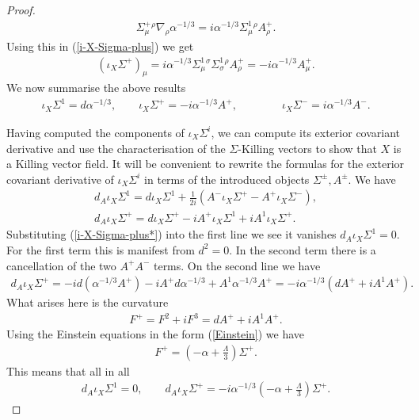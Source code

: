 \documentclass[10pt]{report}
\theoremstyle{definition}
\begin{document}
\begin{proof}
       \begin{align}
      \Sigma^+_\mu{}^\rho \nabla_\rho \alpha^{-1/3}  = i \alpha^{-1/3} \Sigma^1_\mu{}^\rho A^+_\rho.
      \end{align}
      Using this in (\ref{i-X-Sigma-plus}) we get
       \begin{align}
      (\iota_X \Sigma^+)_\mu =  i \alpha^{-1/3} \Sigma^1_\mu{}^\sigma  \Sigma^1_\sigma{}^\rho A^+_\rho = -i \alpha^{-1/3}A^+_\mu.
      \end{align}
      We now summarise the above results
      \begin{align}\label{i-X-Sigma-plus*}
      \iota_X \Sigma^1 = d \alpha^{-1/3}, \qquad \iota_X \Sigma^+= -i \alpha^{-1/3}A^+, \qquad  \qquad \iota_X \Sigma^-= i \alpha^{-1/3}A^-.
 \end{align}
 
  Having computed the components of $\iota_X \Sigma^i$, we can compute its exterior covariant derivative and use the characterisation of the $\Sigma$-Killing vectors to show that $X$ is a Killing vector field. It will be convenient to rewrite the formulas for the exterior covariant derivative of $\iota_X \Sigma^i$ in terms of the introduced objects $\Sigma^\pm, A^\pm$. We have
   \begin{align}
  d_A \iota_X \Sigma^1 = d \iota_X \Sigma^1 + \frac{1}{2i} (A^- \iota_X \Sigma^+ - A^+ \iota_X \Sigma^-), \\ \nonumber
  d_A \iota_X\Sigma^+ = d  \iota_X \Sigma^+ - i A^+ \iota_X \Sigma^1 + i A^1 \iota_X \Sigma^+.
    \end{align}
    Substituting (\ref{i-X-Sigma-plus*}) into the first line we see it vanishes $d_A \iota_X \Sigma^1=0$. For the first term this is manifest from $d^2=0$. In the second term there is a cancellation of the two $A^+ A^-$ terms. On the second line we have
    \begin{align}
     d_A \iota_X\Sigma^+ = -i d( \alpha^{-1/3} A^+)  - i A^+ d \alpha^{-1/3} +  A^1 \alpha^{-1/3}A^+ = - i \alpha^{-1/3} (dA^+ +i A^1 A^+).
    \end{align}
What arises here is the curvature 
 \begin{align}
 F^+ = F^2 +i  F^3 = dA^+ +i A^1 A^+.
 \end{align}
 Using the Einstein equations in the form (\ref{Einstein}) we have
 \begin{align}
 F^+ = (-\alpha + \frac{\Lambda}{3}) \Sigma^+.
\end{align}
 This means that all in all
 \begin{align}
 d_A \iota_X\Sigma^1=0, \qquad d_A \iota_X\Sigma^+ = -i \alpha^{-1/3}(-\alpha + \frac{\Lambda}{3}) \Sigma^+.
 \end{align}
    

\end{proof}
\end{document}
